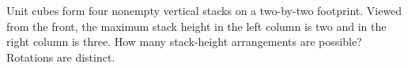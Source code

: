 Unit cubes form four nonempty vertical stacks on a two-by-two footprint. Viewed from the front, the maximum stack height in the left column is two and in the right column is three. How many stack-height arrangements are possible? Rotations are distinct.
